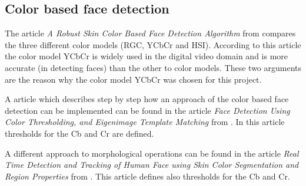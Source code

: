 \documentclass[Bachelorarbeit.tex]{subfiles}
\begin{document}
\subsection{Color based face detection}
The article \textit{A Robust Skin Color Based Face Detection Algorithm} from \cite{RobustSkinColorFD} compares the three different color models (RGC, YCbCr and HSI). According to this article the color model YCbCr is widely used in the digital video domain and is more accurate (in detecting faces) than the other to color models. These two arguments are the reason why the color model YCbCr was chosen for this project.\bigskip 

A article which describes step by step how an approach of the color based face detection can be implemented can be found in the article \textit{Face Detection Using Color Thresholding, and Eigenimage Template Matching} from \cite{ColorAndEigenimage}. In this article thresholds for the Cb and Cr are defined.\bigskip 

A different approach to morphological operations can be found in the article \textit{Real Time Detection and Tracking of Human Face using Skin Color Segmentation and Region Properties} from \cite{RTFaceDetection}. This article defines also thresholds for the Cb and Cr.
\end{document}
